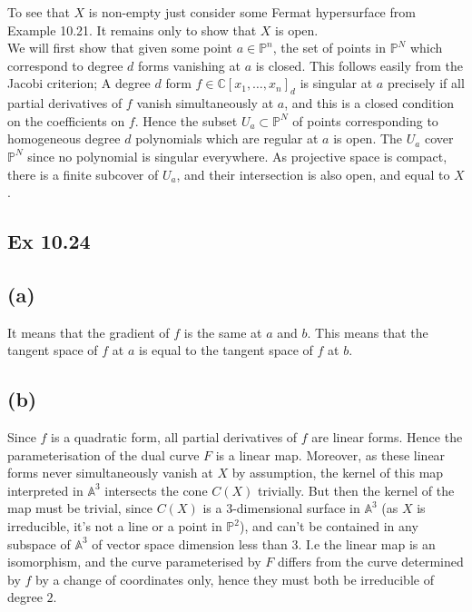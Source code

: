 \documentclass{article}
\theoremstyle{definition}
\newcommand{\C}{\mathbb{C}}
\renewcommand{\P}{\mathbb{P}}
\newcommand{\A}{\mathbb{A}}
\renewcommand{\AA}[1]{\A^{#1}}
\newcommand{\PP}[1]{\P^{#1}}
\newcommand{\Pn}{\P^n}
\begin{document}
To see that $X$ is non-empty just consider some Fermat hypersurface
from Example 10.21. It remains only to show that $X$ is open. \\

We will first show that given some point $a \in \Pn$, the set of points in
$\PP{N}$ which correspond to degree $d$ forms vanishing at $a$ is closed. This
follows easily from the Jacobi criterion; A degree $d$ form $f \in \C[x_1,
\ldots, x_n]_d$ is singular at $a$ precisely if all partial derivatives of $f$
vanish simultaneously at $a$, and this is a closed condition on the
coefficients on $f$. Hence the subset $U_a \subset \PP{N}$ of points
corresponding to homogeneous degree $d$ polynomials which are regular at $a$ is
open. The $U_a$ cover $\PP{N}$ since no polynomial is singular everywhere. As
projective space is compact, there is a finite subcover of $U_a$, and their
intersection is also open, and equal to $X$.


\subsection*{Ex 10.24}

\subsection*{(a)}

It means that the gradient of $f$ is the same at $a$ and $b$. This means that
the tangent space of $f$ at $a$ is equal to the tangent space of $f$ at $b$.

\subsection*{(b)}

Since $f$ is a quadratic form, all partial derivatives of $f$ are linear forms.
Hence the parameterisation of the dual curve $F$ is a linear map. Moreover, as
these linear forms never simultaneously vanish at $X$ by assumption, the kernel
of this map interpreted in $\AA{3}$ intersects the cone $C(X)$ trivially. But
then the kernel of the map must be trivial, since $C(X)$ is a $3$-dimensional
surface in $\AA{3}$ (as $X$ is irreducible, it's not a line or a point in
$\PP{2}$), and can't be contained in any subspace of $\AA{3}$ of vector space
dimension less than $3$. I.e the linear map is an isomorphism, and the curve
parameterised by $F$ differs from the curve determined by $f$ by a change of
coordinates only, hence they must both be irreducible of degree $2$. \\
\end{document}
